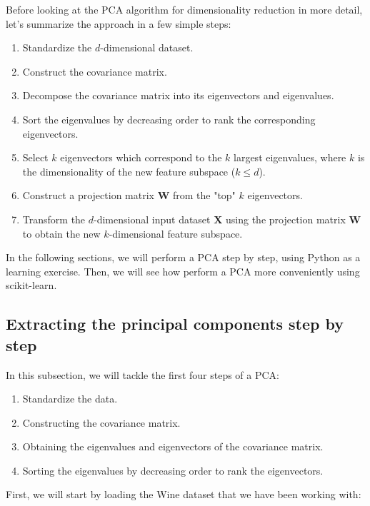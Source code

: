 \documentclass[11pt]{article}
\providecommand{\tightlist}{%
      \setlength{\itemsep}{0pt}\setlength{\parskip}{0pt}}
\begin{document}
Before looking at the PCA algorithm for dimensionality reduction in more
detail, let's summarize the approach in a few simple steps:

\begin{enumerate}
\def\labelenumi{\arabic{enumi}.}
\tightlist
\item
  Standardize the \(d\)-dimensional dataset.
\item
  Construct the covariance matrix.
\item
  Decompose the covariance matrix into its eigenvectors and eigenvalues.
\item
  Sort the eigenvalues by decreasing order to rank the corresponding
  eigenvectors.
\item
  Select \(k\) eigenvectors which correspond to the \(k\) largest
  eigenvalues, where \(k\) is the dimensionality of the new feature
  subspace (\(k \le d\)).
\item
  Construct a projection matrix \textbf{W} from the "top" \(k\)
  eigenvectors.
\item
  Transform the \(d\)-dimensional input dataset \textbf{X} using the
  projection matrix \textbf{W} to obtain the new \(k\)-dimensional
  feature subspace.
\end{enumerate}

In the following sections, we will perform a PCA step by step, using
Python as a learning exercise. Then, we will see how perform a PCA more
conveniently using scikit-learn.

    \subsection{Extracting the principal components step by
step}\label{extracting-the-principal-components-step-by-step}

    In this subsection, we will tackle the first four steps of a PCA:

\begin{enumerate}
\def\labelenumi{\arabic{enumi}.}
\tightlist
\item
  Standardize the data.
\item
  Constructing the covariance matrix.
\item
  Obtaining the eigenvalues and eigenvectors of the covariance matrix.
\item
  Sorting the eigenvalues by decreasing order to rank the eigenvectors.
\end{enumerate}

First, we will start by loading the Wine dataset that we have been
working with:
\end{document}
